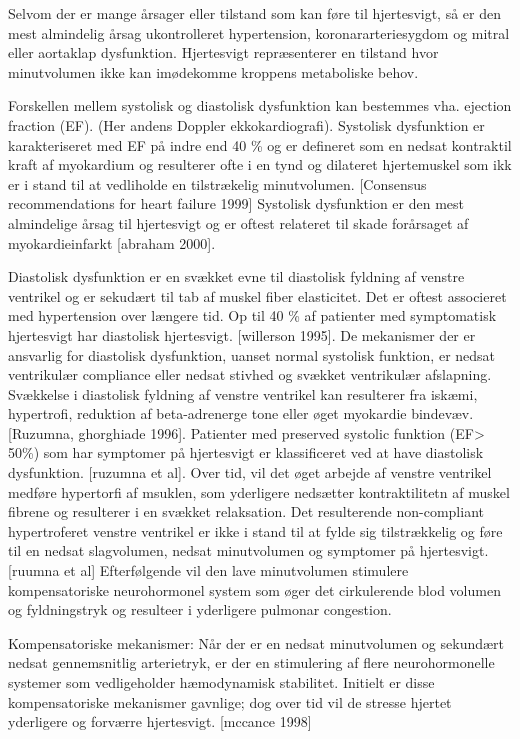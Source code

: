 Selvom der er mange årsager eller tilstand som kan føre til hjertesvigt, så er den mest almindelig årsag ukontrolleret hypertension, koronararteriesygdom og mitral eller aortaklap dysfunktion.  Hjertesvigt repræsenterer en tilstand hvor minutvolumen ikke kan imødekomme kroppens metaboliske behov. 

Forskellen mellem systolisk og diastolisk dysfunktion kan bestemmes vha. ejection fraction (EF). (Her andens Doppler ekkokardiografi). Systolisk dysfunktion er karakteriseret med EF på indre end 40 \% og er defineret som en nedsat kontraktil kraft af myokardium og resulterer ofte i en tynd og dilateret hjertemuskel som ikk er i stand til at vedliholde en tilstrækelig minutvolumen. [Consensus recommendations for heart failure 1999] Systolisk dysfunktion er den mest almindelige årsag til hjertesvigt og er oftest relateret til skade forårsaget af myokardieinfarkt [abraham 2000]. 

Diastolisk dysfunktion er en svækket evne til diastolisk fyldning af venstre ventrikel og er sekudært til tab af muskel fiber elasticitet. Det er oftest associeret med hypertension over længere tid. Op til 40 \% af patienter med symptomatisk hjertesvigt har diastolisk hjertesvigt. [willerson 1995]. De mekanismer der er ansvarlig for diastolisk dysfunktion, uanset normal systolisk funktion, er nedsat ventrikulær compliance eller nedsat stivhed og svækket ventrikulær afslapning. Svækkelse i diastolisk fyldning af venstre ventrikel kan resulterer fra iskæmi, hypertrofi, reduktion af beta-adrenerge tone eller øget myokardie bindevæv. [Ruzumna, ghorghiade 1996]. Patienter med preserved systolic funktion (EF> 50\%) som har symptomer på hjertesvigt er klassificeret ved at have diastolisk dysfunktion. [ruzumna et al]. Over tid, vil det øget arbejde af venstre ventrikel medføre hypertorfi af msuklen, som yderligere nedsætter kontraktilitetn af muskel fibrene og resulterer i en svækket relaksation. Det resulterende non-compliant hypertroferet venstre ventrikel er ikke i stand til at fylde sig tilstrækkelig og føre til en nedsat slagvolumen, nedsat minutvolumen og symptomer på hjertesvigt. [ruumna et al] Efterfølgende vil den lave minutvolumen stimulere kompensatoriske neurohormonel system som øger det cirkulerende blod volumen og fyldningstryk og resulteer i yderligere pulmonar congestion.

Kompensatoriske mekanismer: Når der er en nedsat minutvolumen og sekundært nedsat gennemsnitlig arterietryk, er der en stimulering af flere neurohormonelle systemer som vedligeholder hæmodynamisk stabilitet. Initielt er disse kompensatoriske mekanismer gavnlige; dog over tid vil de stresse hjertet yderligere og forværre hjertesvigt. [mccance 1998] 

